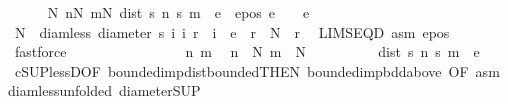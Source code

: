 \begin{isabellebody}
\ \ \ \ \isamarkupfalse%
\ {\isachardoublequoteopen}{\isasymexists}N{\isachardot}{\kern0pt}\ {\isasymforall}n{\isasymge}N{\isachardot}{\kern0pt}\ {\isasymforall}m{\isasymge}N{\isachardot}{\kern0pt}\ dist\ {\isacharparenleft}{\kern0pt}s\ n{\isacharparenright}{\kern0pt}\ {\isacharparenleft}{\kern0pt}s\ m{\isacharparenright}{\kern0pt}\ {\isacharless}{\kern0pt}\ e{\isachardoublequoteclose}\ \ e{\isacharunderscore}{\kern0pt}pos{\isacharcolon}{\kern0pt}\ {\isachardoublequoteopen}e\ {\isachargreater}{\kern0pt}\ {}{\isachardoublequoteclose}\ \ e\isanewline
\ \ \ \ \isamarkupfalse%
\ {\isacharminus}{\kern0pt}\isanewline
\ \ \ \ \ \ \isamarkupfalse%
\ N\ \ diam{\isacharunderscore}{\kern0pt}less{\isacharcolon}{\kern0pt}\ {\isachardoublequoteopen}diameter\ {\isacharbraceleft}{\kern0pt}s\ i\ {\isacharbar}{\kern0pt}i{\isachardot}{\kern0pt}\ r\ {\isasymle}\ i{\isacharbraceright}{\kern0pt}\ {\isacharless}{\kern0pt}\ e{\isachardoublequoteclose}\ \ {\isachardoublequoteopen}r\ {\isasymge}\ N{\isachardoublequoteclose}\ \ r\ \isamarkupfalse%
\ LIMSEQ{\isacharunderscore}{\kern0pt}D\ asm{\isacharparenleft}{\kern0pt}{}{\isacharparenright}{\kern0pt}\ e{\isacharunderscore}{\kern0pt}pos\ \isamarkupfalse%
\ fastforce\isanewline
\ \ \ \ \ \ \isacommand{{\isacharbraceleft}{\kern0pt}}\isamarkupfalse%
\isanewline
\ \ \ \ \ \ \ \ \isamarkupfalse%
\ n\ m\ \isamarkupfalse%
\ {\isachardoublequoteopen}n\ {\isasymge}\ N{\isachardoublequoteclose}\ {\isachardoublequoteopen}m\ {\isasymge}\ N{\isachardoublequoteclose}\isanewline
\ \ \ \ \ \ \ \ \isamarkupfalse%
\ {\isachardoublequoteopen}dist\ {\isacharparenleft}{\kern0pt}s\ n{\isacharparenright}{\kern0pt}\ {\isacharparenleft}{\kern0pt}s\ m{\isacharparenright}{\kern0pt}\ {\isacharless}{\kern0pt}\ e{\isachardoublequoteclose}\ \isamarkupfalse%
\ cSUP{\isacharunderscore}{\kern0pt}lessD{\isacharbrackleft}{\kern0pt}OF\ bounded{\isacharunderscore}{\kern0pt}imp{\isacharunderscore}{\kern0pt}dist{\isacharunderscore}{\kern0pt}bounded{\isacharbrackleft}{\kern0pt}THEN\ bounded{\isacharunderscore}{\kern0pt}imp{\isacharunderscore}{\kern0pt}bdd{\isacharunderscore}{\kern0pt}above{\isacharbrackright}{\kern0pt}{\isacharcomma}{\kern0pt}\ OF\ asm{\isacharparenleft}{\kern0pt}{}{\isacharparenright}{\kern0pt}\ diam{\isacharunderscore}{\kern0pt}less{\isacharbrackleft}{\kern0pt}unfolded\ diameter{\isacharunderscore}{\kern0pt}SUP{\isacharbrackright}{\kern0pt}{\isacharbrackright}{\kern0pt}\ \isamarkupfalse%

\end{isabellebody}
